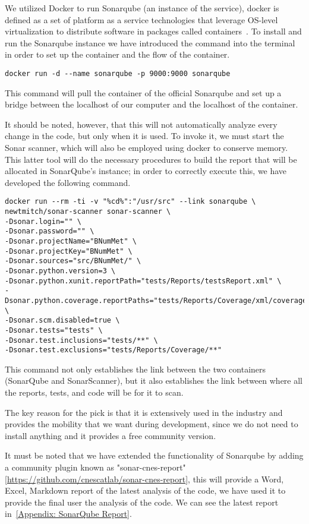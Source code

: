 We utilized Docker to run Sonarqube (an instance of the service), docker is defined as a set of platform as a service technologies that leverage OS-level virtualization to distribute software in packages called containers~\cite{enwiki:1148220158}. To install and run the Sonarqube instance we have introduced the command into the terminal in order to set up the container and the flow of the container.

\begin{lstlisting}
docker run -d --name sonarqube -p 9000:9000 sonarqube
\end{lstlisting}

This command will pull the container of the official Sonarqube and set up a bridge between the localhost of our computer and the localhost of the container.

It should be noted, however, that this will not automatically analyze every change in the code, but only when it is used. To invoke it, we must start the Sonar scanner, which will also be employed using docker to conserve memory. This latter tool will do the necessary procedures to build the report that will be allocated in SonarQube's instance; in order to correctly execute this, we have developed the following command.

\begin{lstlisting}
docker run --rm -ti -v "%cd%":"/usr/src" --link sonarqube \
newtmitch/sonar-scanner sonar-scanner \
-Dsonar.login="" \
-Dsonar.password="" \
-Dsonar.projectName="BNumMet" \
-Dsonar.projectKey="BNumMet" \
-Dsonar.sources="src/BNumMet/" \
-Dsonar.python.version=3 \
-Dsonar.python.xunit.reportPath="tests/Reports/testsReport.xml" \
-Dsonar.python.coverage.reportPaths="tests/Reports/Coverage/xml/coverage.xml" \
-Dsonar.scm.disabled=true \
-Dsonar.tests="tests" \
-Dsonar.test.inclusions="tests/**" \
-Dsonar.test.exclusions="tests/Reports/Coverage/**"
\end{lstlisting}

This command not only establishes the link between the two containers (SonarQube and SonarScanner), but it also establishes the link between where all the reports, tests, and code will be for it to scan.

The key reason for the pick is that it is extensively used in the industry and provides the mobility that we want during development, since we do not need to install anything and it provides a free community version.

It must be noted that we have extended the functionality of Sonarqube by adding a community plugin known as "sonar-cnes-report" [\href{https://github.com/cnescatlab/sonar-cnes-report}{https://github.com/cnescatlab/sonar-cnes-report}], this will provide a Word, Excel, Markdown report of the latest analysis of the code, we have used it to provide the final user the analysis of the code. We can see the latest report in~\hyperlink{Appendix:SonarqubeReport}{[Appendix: SonarQube Report]}.